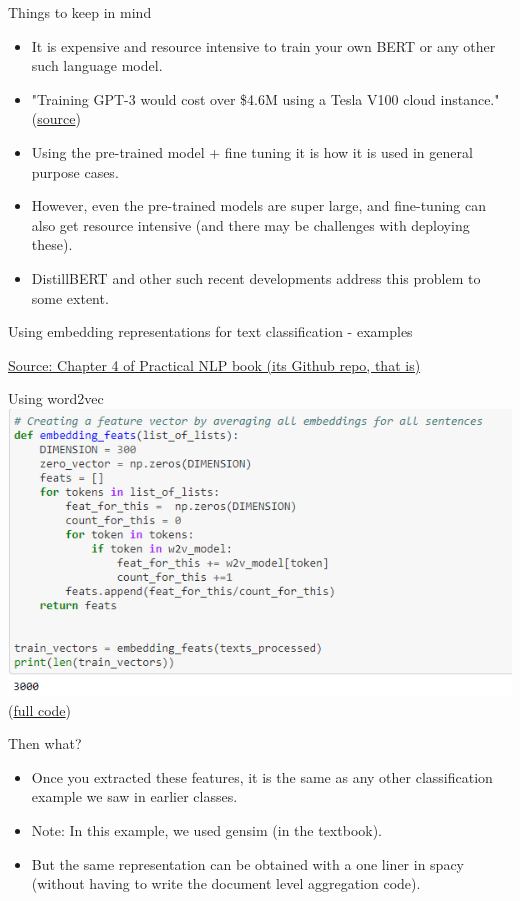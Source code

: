 \documentclass{beamer}
\begin{document}
\begin{frame}{Things to keep in mind}
\begin{itemize}
    \item It is expensive and resource intensive to train your own BERT or any other such language model. \item "Training GPT-3 would cost over \$4.6M using a Tesla V100 cloud instance." (\href{https://lambdalabs.com/blog/demystifying-gpt-3/}{source})
    \item Using the pre-trained model + fine tuning it is how it is used in general purpose cases.
    \item However, even the pre-trained models are super large, and fine-tuning can also get resource intensive (and there may be challenges with deploying these). \pause
    \item DistillBERT and other such recent developments address this problem to some extent. 
\end{itemize}    
\end{frame}

\begin{frame}{}
    \Large Using embedding representations for text classification - examples
    
    \href{https://github.com/practical-nlp/practical-nlp/tree/master/Ch4}{Source: Chapter 4 of Practical NLP book (its Github repo, that is)}
\end{frame}

\begin{frame}{Using word2vec}
    \includegraphics[width=\textwidth]{figures/w2vfeatextractor.PNG}
    (\href{https://github.com/practical-nlp/practical-nlp/blob/master/Ch4/03_Word2Vec_Example.ipynb}{full code})
\end{frame}

\begin{frame}{Then what?}
    \begin{itemize}
        \item Once you extracted these features, it is the same as any other classification example we saw in earlier classes. 
        \item Note: In this example, we used  gensim (in the textbook).
        \item But the same representation can be obtained with a one liner in spacy (without having to write the document level aggregation code).
    \end{itemize}
\end{frame}
\end{document}
